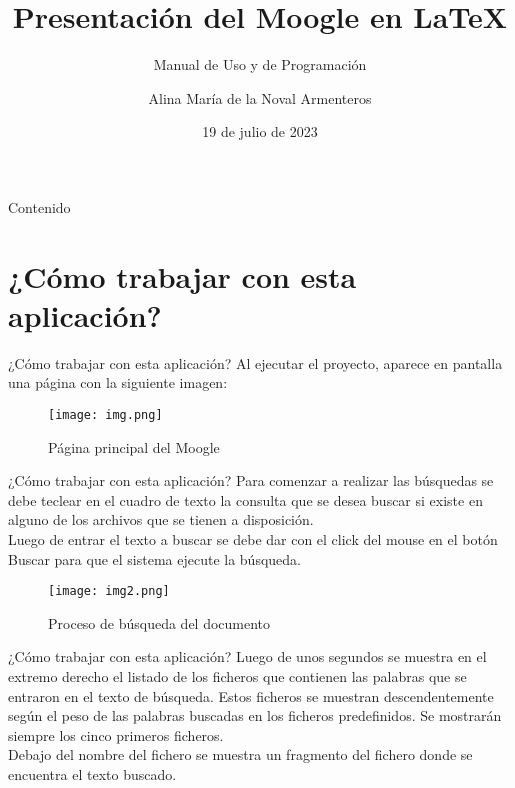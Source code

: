 \documentclass[11pt]{beamer}
\author{Alina María de la Noval Armenteros}
\title{Presentación del Moogle en \LaTeX}
\subtitle{Manual de Uso y de Programación}
\institute[UH]{Facultad de Matemática y Computación\\Universidad de la Habana}
\date{19 de julio de 2023}
\begin{document}
	
	\begin{frame}
		\maketitle
	\end{frame}
	
	\begin{frame}{Contenido}
		\tableofcontents
	\end{frame}
	
	\section {¿Cómo trabajar con esta aplicación?}
	\begin{frame}{¿Cómo trabajar con esta aplicación?} 
		\justifying
		\large Al ejecutar el proyecto, aparece en pantalla una página con la siguiente imagen:
		
		\begin{figure}[H]
			\centering
			\texttt{[image: img.png]}
			\caption{Página principal del Moogle}
			\label{fig: Figura 1}
		\end{figure}
		
	\end{frame}
	
	\begin{frame}{¿Cómo trabajar con esta aplicación?}
		\justifying
		Para comenzar a realizar las búsquedas se debe teclear en el cuadro de texto la consulta que se desea buscar si existe en alguno de los archivos que se tienen a disposición.\\
		
		Luego de entrar el texto a buscar se debe dar con el click del mouse en el botón Buscar para que el sistema ejecute la búsqueda.
		
		\begin{figure}[H]
			\centering
			\texttt{[image: img2.png]}
			\caption{Proceso de búsqueda del documento}
			\label{fig: Figura 2}
		\end{figure}
	\end{frame}
	
	\begin{frame}{¿Cómo trabajar con esta aplicación?}
		\justifying
		Luego de unos segundos se muestra en el extremo derecho el listado de los ficheros que contienen las palabras que se entraron en el texto de búsqueda. Estos ficheros se muestran descendentemente según el peso de las palabras buscadas en los ficheros predefinidos. Se mostrarán siempre los cinco primeros ficheros.\\
		
		Debajo del nombre del fichero se muestra un fragmento del fichero donde se encuentra el texto buscado.
	\end{frame}
	
\end{document}
